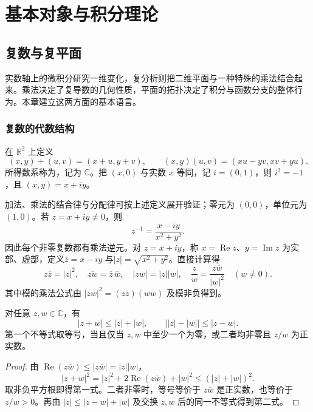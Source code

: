 \documentclass[UTF8,12pt,a4paper,fontset=fandol]{ctexbook}
\begin{document}
\part{基本对象与积分理论}

\chapter{复数与复平面}
\label{chap:ca-plane}

实数轴上的微积分研究一维变化，复分析则把二维平面与一种特殊的乘法结合起来。乘法决定了复导数的几何性质，平面的拓扑决定了积分与函数分支的整体行为。本章建立这两方面的基本语言。

\section{复数的代数结构}

\begin{definition}[复数]
在 $\mathbb{R}^2$ 上定义
\[
 (x,y)+(u,v)=(x+u,y+v),\qquad
 (x,y)(u,v)=(xu-yv,xv+yu).
\]
所得数系称为，记为 $\mathbb{C}$。把 $(x,0)$ 与实数 $x$ 等同，记 $i=(0,1)$，则 $i^2=-1$，且 $(x,y)=x+iy$。
\end{definition}

加法、乘法的结合律与分配律可按上述定义展开验证；零元为 $(0,0)$，单位元为 $(1,0)$。若 $z=x+iy\ne0$，则
\[
 z^{-1}=\frac{x-iy}{x^2+y^2}.
\]
因此每个非零复数都有乘法逆元。对 $z=x+iy$，称 $x=\operatorname{Re}z$、$y=\operatorname{Im}z$ 为实部、虚部，定义$\overline z=x-iy$ 与$|z|=\sqrt{x^2+y^2}$。直接计算得
\begin{equation}
 z\overline z=|z|^2,\quad
 \overline{zw}=\overline z\,\overline w,\quad
 |zw|=|z||w|,\quad
 \frac{z}{w}=\frac{z\overline w}{|w|^2}\quad(w\ne0).
 \label{eq:ca-modulus-rules}
\end{equation}
其中模的乘法公式由 $|zw|^2=(z\overline z)(w\overline w)$ 及模非负得到。

\begin{proposition}[模的不等式]
\label{prop:ca-triangle}
对任意 $z,w\in\mathbb{C}$，有
\[
 |z+w|\le|z|+|w|,\qquad
 \bigl||z|-|w|\bigr|\le|z-w|.
\]
第一个不等式取等号，当且仅当 $z,w$ 中至少一个为零，或二者均非零且 $z/w$ 为正实数。
\end{proposition}
\begin{proof}
由 $\operatorname{Re}(z\overline w)\le|z\overline w|=|z||w|$，
\[
 |z+w|^2=|z|^2+2\operatorname{Re}(z\overline w)+|w|^2
 \le(|z|+|w|)^2.
\]
取非负平方根即得第一式。二者非零时，等号等价于 $z\overline w$ 是正实数，也等价于 $z/w>0$。再由 $|z|\le|z-w|+|w|$ 及交换 $z,w$ 后的同一不等式得到第二式。
\end{proof}
\end{document}
